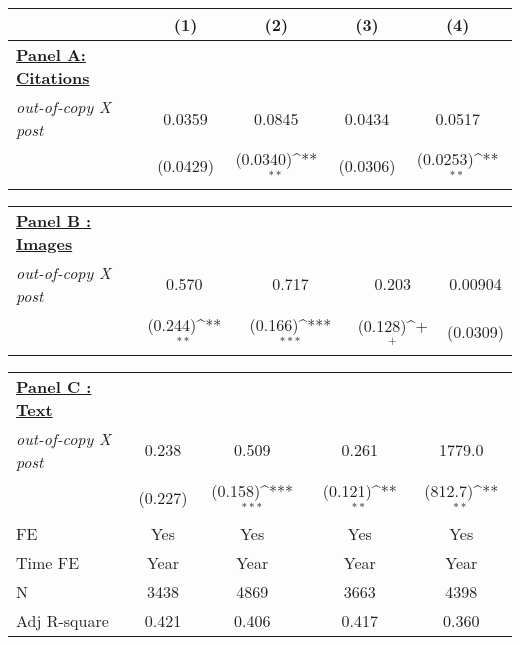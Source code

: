 {
\def\sym#1{\ifmmode^{#1}\else\(^{#1}\)\fi}
\begin{tabular*}{\hsize}{@{\hskip\tabcolsep\extracolsep\fill}l*{4}{c}}
\toprule
                                                  &\multicolumn{1}{c}{(1)}&\multicolumn{1}{c}{(2)}&\multicolumn{1}{c}{(3)}&\multicolumn{1}{c}{(4)}\\
\midrule \underline{\textbf{Panel A: Citations}} \vspace{5mm}\\
\emph{out-of-copy X post}                         &      0.0359         &      0.0845         &      0.0434         &      0.0517         \\
                                                  &    (0.0429)         &    (0.0340)\sym{**} &    (0.0306)         &    (0.0253)\sym{**} \\

\end{tabular*} }
{
\def\sym#1{\ifmmode^{#1}\else\(^{#1}\)\fi}
\begin{tabular*}{\hsize}{@{\hskip\tabcolsep\extracolsep\fill}l*{4}{c}}
\midrule \vspace{5mm} \underline{\textbf{Panel B : Images}}\hphantom{ons}\vspace{5mm}\\
\emph{out-of-copy X post}                         &       0.570         &       0.717         &       0.203         &     0.00904         \\
                                                  &     (0.244)\sym{**} &     (0.166)\sym{***}&     (0.128)\sym{+}  &    (0.0309)         \\

\end{tabular*} }
{
\def\sym#1{\ifmmode^{#1}\else\(^{#1}\)\fi}
\begin{tabular*}{\hsize}{@{\hskip\tabcolsep\extracolsep\fill}l*{4}{c}}
\midrule \vspace{5mm} \underline{\textbf{Panel C : Text}}\hphantom{ations}\vspace{5mm}\\
\emph{out-of-copy X post}                         &       0.238         &       0.509         &       0.261         &      1779.0         \\
                                                  &     (0.227)         &     (0.158)\sym{***}&     (0.121)\sym{**} &     (812.7)\sym{**} \\
\midrule
 FE                                               &         Yes         &         Yes         &         Yes         &         Yes         \\
Time FE                                           &        Year         &        Year         &        Year         &        Year         \\
N                                                 &        3438         &        4869         &        3663         &        4398         \\
Adj R-square                                      &       0.421         &       0.406         &       0.417         &       0.360         \\
\bottomrule
\end{tabular*}
}
